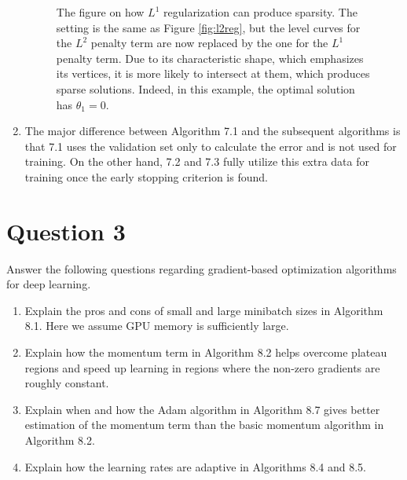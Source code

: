 \documentclass[
	12pt, %
]{../Template/fphw}
\begin{document}
\begin{enumerate}[label = (\arabic*)]
\begin{figure}
        \caption{The figure on how $L^1$ regularization can produce sparsity. The setting is the same as Figure \ref{fig:l2reg}, but the level curves for the $L^2$ penalty term are now replaced by the one for the $L^1$ penalty term. Due to its characteristic shape, which emphasizes its vertices, it is more likely to intersect at them, which produces sparse solutions. Indeed, in this example, the optimal solution has $\theta_1=0$.}
        \label{fig:l1sparse}
    \end{figure}
    \item The major difference between Algorithm 7.1 and the subsequent algorithms is that 7.1 uses the validation set only to calculate the error and is not used for training. On the other hand, 7.2 and 7.3 fully utilize this extra data for training once the early stopping criterion is found.
\end{enumerate}


\section*{Question 3}

\begin{problem}
Answer the following questions regarding gradient-based optimization algorithms for deep
learning.
\begin{enumerate}[label=(\arabic*)]
\item Explain the pros and cons of small and large minibatch sizes in Algorithm 8.1. Here we assume GPU memory
is sufficiently large.
\item Explain how the momentum term in Algorithm 8.2 helps overcome plateau regions and speed up learning in
regions where the non-zero gradients are roughly constant.
\item Explain when and how the Adam algorithm in Algorithm 8.7 gives better estimation of the momentum term
than the basic momentum algorithm in Algorithm 8.2.
\item Explain how the learning rates are adaptive in Algorithms 8.4 and 8.5.
\end{enumerate}


\end{problem}
\end{document}

